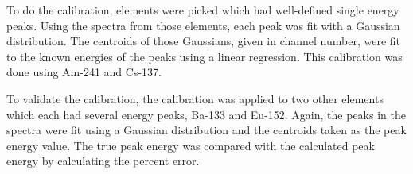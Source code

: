 To do the calibration, elements were picked which had well-defined single energy peaks. Using the spectra from those elements, each peak was fit with a Gaussian distribution. The centroids of those Gaussians, given in channel number, were fit to the known energies of the peaks using a linear regression. This calibration was done using Am-241 and Cs-137. 

To validate the calibration, the calibration was applied to two other elements which each had several energy peaks, Ba-133 and Eu-152. Again, the peaks in the spectra were fit using a Gaussian distribution and the centroids taken as the peak energy value. The true peak energy was compared with the calculated peak energy by calculating the percent error. 
